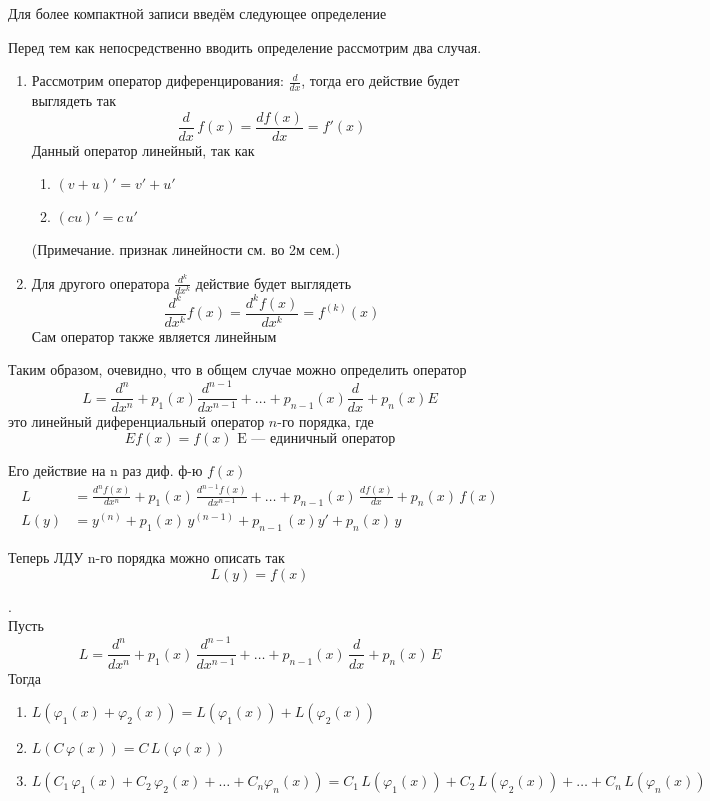Для более компактной записи введём следующее определение
\begin{Def}
    Перед тем как непосредственно вводить определение рассмотрим два случая.
    \begin{enumerate}
        \item Рассмотрим оператор диференцирования: $\frac{d}{dx}$, тогда его действие будет выглядеть так 
        \[
            \frac{d}{dx}\,f(x)=\frac{df(x)}{dx}=f'(x)
        \]
        Данный оператор линейный, так как
        \begin{enumerate}
            \item $(v+u)'=v'+u'$
            \item $(cu)'=c\,u'$
        \end{enumerate}
        (Примечание. признак линейности см. во 2м сем.)
        
        \item Для другого оператора $\frac{d^k}{dx^k}$ действие будет выглядеть \[
            \frac{d^k}{dx^k}f(x)=\frac{d^kf(x)}{dx^k}=f^(k)(x)
        \]
        Сам оператор также является линейным
    \end{enumerate}
    Таким образом, очевидно, что в общем случае можно определить оператор
    \[
        L=\frac{d^n}{dx^n}+p_1(x)\frac{d^{n-1}}{dx^{n-1}}+\dots +p_{n-1}(x)\frac{d}{dx}+p_n(x)E
    \] 
    это линейный диференциальный оператор $n$-го порядка, где
    \[
        Ef(x)=f(x) \text{ E --- единичный оператор}
    \]
    
    Его действие на n раз диф. ф-ю $f(x)$
    \begin{align*}
        L&=\frac{d^nf(x)}{dx^n} + p_1(x)\,\frac{d^{n-1}f(x)}{dx^{n-1}}+ \dots +p_{n-1}(x)\,\frac{df(x)}{dx}+p_n(x)\,f(x)\\
        L(y)&=y^{(n)}+p_1(x)\,y^{(n-1)}+p_{n-1}\,(x)y'+p_n(x)\,y    
    \end{align*}
\end{Def}



\begin{Note}
    Теперь ЛДУ n-го порядка можно описать так 
    \[
        L(y)=f(x)
    \]
\end{Note}

\begin{Note}.\\
    Пусть 
    \[
        L=\frac{d^n}{dx^n}+p_1(x)\,\frac{d^{n-1}}{dx^{n-1}}+ \dots +p_{n-1}(x)\,\frac{d}{dx}+p_n(x)\,E
    \]
    Тогда
    \begin{enumerate}
        \item $L(\varphi_1(x)+\varphi_2(x))=L(\varphi_1(x))+L(\varphi_2(x))$
        \item $L(C\,\varphi(x))=C\,L(\varphi(x))$
        \item $L(C_1 \, \varphi_1(x)+C_2 \, \varphi_2(x) + \dots + C_n\varphi_n(x))=C_1\, L(\varphi_1(x))+C_2 \, L(\varphi_2(x)) + \dots + C_n \, L(\varphi_n(x))$
    \end{enumerate}
 \end{Note}

